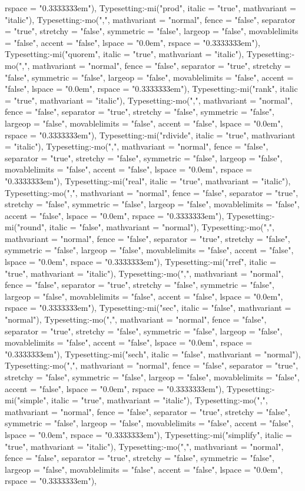 \documentclass{article}
\begin{document}
{{{\begin{maplegroup}
\begin{maplelatex}
rspace = "0.3333333em"), Typesetting:-mi("prod", italic = "true", mathvariant = "italic"), Typesetting:-mo(",", mathvariant = "normal", fence = "false", separator = "true", stretchy = "false", symmetric = "false", largeop = "false", movablelimits = "false", accent = "false", lspace = "0.0em", rspace = "0.3333333em"), Typesetting:-mi("quorem", italic = "true", mathvariant = "italic"), Typesetting:-mo(",", mathvariant = "normal", fence = "false", separator = "true", stretchy = "false", symmetric = "false", largeop = "false", movablelimits = "false", accent = "false", lspace = "0.0em", rspace = "0.3333333em"), Typesetting:-mi("rank", italic = "true", mathvariant = "italic"), Typesetting:-mo(",", mathvariant = "normal", fence = "false", separator = "true", stretchy = "false", symmetric = "false", largeop = "false", movablelimits = "false", accent = "false", lspace = "0.0em", rspace = "0.3333333em"), Typesetting:-mi("rdivide", italic = "true", mathvariant = "italic"), Typesetting:-mo(",", mathvariant = "normal", fence = "false", separator = "true", stretchy = "false", symmetric = "false", largeop = "false", movablelimits = "false", accent = "false", lspace = "0.0em", rspace = "0.3333333em"), Typesetting:-mi("real", italic = "true", mathvariant = "italic"), Typesetting:-mo(",", mathvariant = "normal", fence = "false", separator = "true", stretchy = "false", symmetric = "false", largeop = "false", movablelimits = "false", accent = "false", lspace = "0.0em", rspace = "0.3333333em"), Typesetting:-mi("round", italic = "false", mathvariant = "normal"), Typesetting:-mo(",", mathvariant = "normal", fence = "false", separator = "true", stretchy = "false", symmetric = "false", largeop = "false", movablelimits = "false", accent = "false", lspace = "0.0em", rspace = "0.3333333em"), Typesetting:-mi("rref", italic = "true", mathvariant = "italic"), Typesetting:-mo(",", mathvariant = "normal", fence = "false", separator = "true", stretchy = "false", symmetric = "false", largeop = "false", movablelimits = "false", accent = "false", lspace = "0.0em", rspace = "0.3333333em"), Typesetting:-mi("sec", italic = "false", mathvariant = "normal"), Typesetting:-mo(",", mathvariant = "normal", fence = "false", separator = "true", stretchy = "false", symmetric = "false", largeop = "false", movablelimits = "false", accent = "false", lspace = "0.0em", rspace = "0.3333333em"), Typesetting:-mi("sech", italic = "false", mathvariant = "normal"), Typesetting:-mo(",", mathvariant = "normal", fence = "false", separator = "true", stretchy = "false", symmetric = "false", largeop = "false", movablelimits = "false", accent = "false", lspace = "0.0em", rspace = "0.3333333em"), Typesetting:-mi("simple", italic = "true", mathvariant = "italic"), Typesetting:-mo(",", mathvariant = "normal", fence = "false", separator = "true", stretchy = "false", symmetric = "false", largeop = "false", movablelimits = "false", accent = "false", lspace = "0.0em", rspace = "0.3333333em"), Typesetting:-mi("simplify", italic = "true", mathvariant = "italic"), Typesetting:-mo(",", mathvariant = "normal", fence = "false", separator = "true", stretchy = "false", symmetric = "false", largeop = "false", movablelimits = "false", accent = "false", lspace = "0.0em", rspace = "0.3333333em"), 
\end{maplelatex}
\end{maplegroup}}}}
\end{document}
